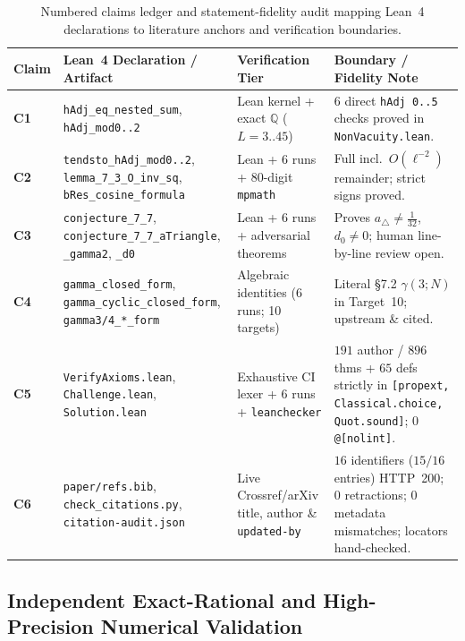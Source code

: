 \documentclass[11pt,a4paper]{article}
\numberwithin{equation}{section}
\theoremstyle{plain}
\theoremstyle{definition}
\theoremstyle{remark}
\newcommand{\code}[1]{\texttt{\small #1}}
\begin{document}
\begin{table}[t]
\centering
\caption{Numbered claims ledger and statement-fidelity audit mapping Lean~4 declarations to literature anchors and verification boundaries.}
\label{tab:claims-fidelity}
\footnotesize
\setlength{\tabcolsep}{4pt}
\begin{tabular}{@{}l >{\raggedright\arraybackslash}p{4.6cm} >{\raggedright\arraybackslash}p{3.9cm} >{\raggedright\arraybackslash}p{4.0cm}@{}}
\toprule
Claim & Lean~4 Declaration / Artifact & Verification Tier & Boundary / Fidelity Note \\
\midrule
\textbf{C1} & \code{hAdj\_eq\_nested\_sum}, \code{hAdj\_mod0..2} & Lean kernel + exact $\mathbb{Q}$ ($L=3..45$) & $6$ direct \code{hAdj 0..5} checks proved in \code{NonVacuity.lean}. \\
\textbf{C2} & \code{tendsto\_hAdj\_mod0..2}, \code{lemma\_7\_3\_O\_inv\_sq}, \code{bRes\_cosine\_formula} & Lean + 6 runs + $80$-digit \code{mpmath} & Full \cite[Lemma~7.3]{banic_elezovic_p2} incl.\ $O(\ell^{-2})$ remainder; strict signs proved. \\
\textbf{C3} & \code{conjecture\_7\_7}, \code{conjecture\_7\_7\_aTriangle}, \code{\_gamma2}, \code{\_d0} & Lean + 6 runs + adversarial theorems & Proves $a_\triangle\ne\frac{1}{32}$, $d_0\ne 0$; human line-by-line review open. \\
\textbf{C4} & \code{gamma\_closed\_form}, \code{gamma\_cyclic\_closed\_form}, \code{gamma3/4\_*\_form} & Algebraic identities (6 runs; 10 targets) & Literal \S7.2 $\gamma(3;N)$ in Target~10; upstream \cite[Thm~7.6, \S7.2, \S8]{banic_elezovic_p2} \& \cite[Thm~3.10]{banic_elezovic_p5} cited. \\
\textbf{C5} & \code{VerifyAxioms.lean}, \code{Challenge.lean}, \code{Solution.lean} & Exhaustive CI lexer + 6 runs + \code{leanchecker} & $191$ author / $896$ thms + $65$ defs strictly in \code{[propext, Classical.choice, Quot.sound]}; $0$ \code{@[nolint]}. \\
\textbf{C6} & \code{paper/refs.bib}, \code{check\_citations.py}, \code{citation-audit.json} & Live Crossref/arXiv title, author \& \code{updated-by} & $16$ identifiers ($15/16$ entries) HTTP~200; $0$ retractions; $0$ metadata mismatches; locators hand-checked. \\
\bottomrule
\end{tabular}
\end{table}

\subsection{Independent Exact-Rational and High-Precision Numerical Validation}
\end{document}
